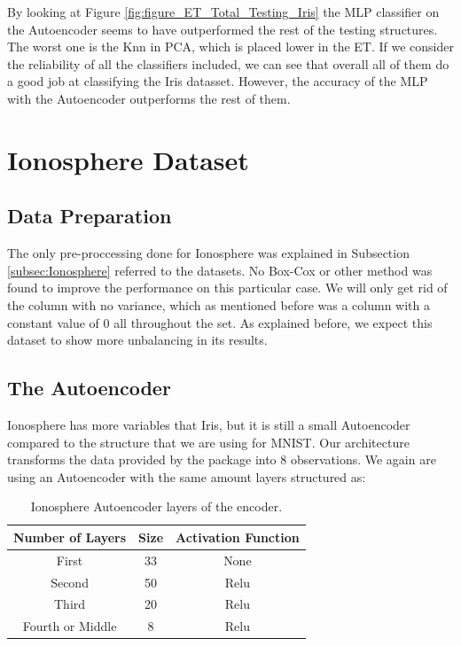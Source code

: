 By looking at Figure \ref{fig:figure_ET_Total_Testing_Iris} the MLP classifier on the Autoencoder seems to have outperformed the rest of the testing structures. The worst one is the Knn in PCA, which is placed lower in the ET. If we consider the reliability of all the classifiers included, we can see that overall all of them do a good job at classifying the Iris datasset. However, the accuracy of the MLP with the Autoencoder outperforms the rest of them.

\section{Ionosphere Dataset}
\subsection{Data Preparation}

The only pre-proccessing done for Ionosphere was explained in Subsection \ref{subsec:Ionosphere} referred to the datasets. No Box-Cox or other method was found to improve the performance on this particular case. We will only get rid of the column with no variance, which as mentioned before was a column with a constant value of 0 all throughout the set. As explained before, we expect this dataset to show more unbalancing in its results.

\subsection{The Autoencoder}

Ionosphere has more variables that Iris, but it is still a small Autoencoder compared to the structure that we are using for MNIST. Our architecture transforms the data provided by the package into 8 observations. We again are using an Autoencoder with the same amount layers structured as:  \newline

\begin{table}[H]
	\caption{Ionosphere Autoencoder layers of the encoder.}
	\begin{center}
		\label{tab:table_Ionosphere_auto_encoder}
		\begin{tabular}{c|c|c} %
			\textbf{Number of Layers} & \textbf{Size} & \textbf{Activation Function} \\
			\hline
			First & 33 & None\\
			Second & 50 & Relu\\
			Third & 20 & Relu\\
			Fourth or Middle & 8 & Relu\\
		\end{tabular}
	\end{center}
\end{table}

